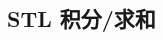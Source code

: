 \documentclass[a4paper,landscape,twocolumn]{ctexart}
\begin{document}
%
%
%
%
%
%
\subsection{STL 积分/求和}
\end{document}
